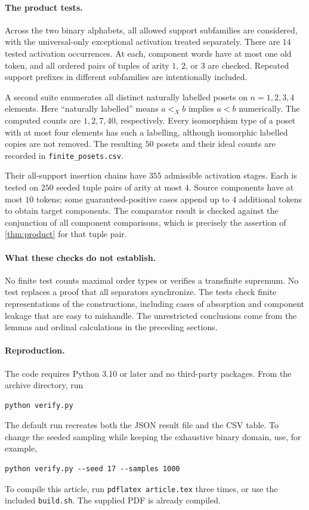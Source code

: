 \documentclass[11pt]{article}
\numberwithin{equation}{section}
\theoremstyle{plain}
\theoremstyle{definition}
\theoremstyle{remark}
\begin{document}
\paragraph{The product tests.}
Across the two binary alphabets, all allowed support subfamilies are considered, with the universal-only exceptional activation treated separately. There are $14$ tested activation occurrences. At each, component words have at most one old token, and all ordered pairs of tuples of arity $1$, $2$, or $3$ are checked. Repeated support prefixes in different subfamilies are intentionally included.

A second suite enumerates all distinct naturally labelled posets on $n=1,2,3,4$ elements. Here ``naturally labelled'' means $a<_X b$ implies $a<b$ numerically. The computed counts are $1,2,7,40$, respectively. Every isomorphism type of a poset with at most four elements has such a labelling, although isomorphic labelled copies are not removed. The resulting $50$ posets and their ideal counts are recorded in \texttt{finite\_posets.csv}.

Their all-support insertion chains have $355$ admissible activation stages. Each is tested on $250$ seeded tuple pairs of arity at most $4$. Source components have at most $10$ tokens; some guaranteed-positive cases append up to $4$ additional tokens to obtain target components. The comparator result is checked against the conjunction of all component comparisons, which is precisely the assertion of \cref{thm:product} for that tuple pair.

\paragraph{What these checks do not establish.}
No finite test counts maximal order types or verifies a transfinite supremum. No test replaces a proof that all separators synchronize. The tests check finite representations of the constructions, including cases of absorption and component leakage that are easy to mishandle. The unrestricted conclusions come from the lemmas and ordinal calculations in the preceding sections.

\paragraph{Reproduction.}
The code requires Python 3.10 or later and no third-party packages. From the archive directory, run
\begin{lstlisting}
python verify.py
\end{lstlisting}
The default run recreates both the JSON result file and the CSV table. To change the seeded sampling while keeping the exhaustive binary domain, use, for example,
\begin{lstlisting}
python verify.py --seed 17 --samples 1000
\end{lstlisting}
To compile this article, run \texttt{pdflatex article.tex} three times, or use the included \texttt{build.sh}. The supplied PDF is already compiled.
\end{document}
